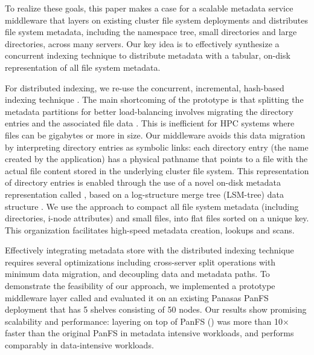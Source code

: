 To realize these goals, this paper makes a case for a scalable metadata service
middleware that layers on existing cluster file system deployments and
distributes file system metadata, including the namespace tree, small
directories and large directories, across many servers.
Our key idea is to effectively synthesize a concurrent indexing
technique to distribute metadata with a tabular, on-disk representation of all
file system metadata.

For distributed indexing, we re-use the concurrent, incremental, hash-based
\giga indexing technique \cite{GIGA11}.
The main shortcoming of the \giga prototype is that splitting
the metadata partitions for better load-balancing involves migrating the
directory entries and the associated file data \cite{GIGA11}.
This is inefficient for HPC systems where files can be gigabytes or more in
size. Our middleware avoids this data migration by interpreting directory
entries as symbolic links: each directory entry (the name created by the
application) has a physical pathname that points to a file
with the actual file content stored in the underlying cluster file system.
This representation of directory entries is enabled through the use
of a novel on-disk metadata representation called \tfs \cite{TableFS},
based on a log-structure merge tree (LSM-tree) data structure \cite{ONeil1996}.
We use the \tfs approach to compact all file system metadata
(including directories, i-node attributes) and small files,
into flat files sorted on a unique key.
This organization facilitates high-speed metadata creation, lookups and scans.

Effectively integrating \tfs metadata store with the distributed indexing
technique requires several optimizations including cross-server split operations
with minimum data migration, and decoupling data and metadata paths.
To demonstrate the feasibility of our approach,
we implemented a prototype middleware layer called \sys and evaluated it
on an existing Panasas PanFS deployment \cite{PanFS} that has 5 shelves consisting of 50 nodes.
Our results show promising scalability and performance:
\sys layering on top of PanFS (\psys) was more than 10$\times$ faster than the original PanFS
in metadata intensive workloads, and performs comparably in data-intensive workloads.
